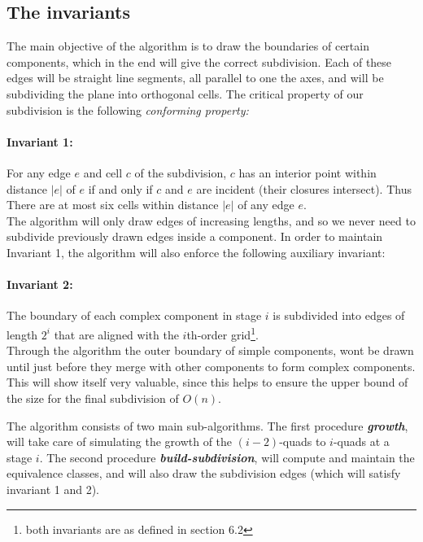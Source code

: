 \subsection{The invariants}

The main objective of the algorithm is to draw the boundaries of certain components, which in 
the end will give the correct subdivision. Each of these edges will be straight line segments,
all parallel to one the axes, and will be subdividing the plane into orthogonal cells. The 
critical property of our subdivision is the following \textit{conforming property:}

\paragraph{Invariant 1:} For any edge $e$ and cell $c$ of the subdivision, $c$ has an interior 
point within distance $|e|$ of $e$ if and only if $c$ and $e$ are incident (their closures 
intersect). Thus There are at most six cells within distance $|e|$ of any edge $e$. \\

The algorithm will only draw edges of increasing lengths, and so we never need to subdivide 
previously drawn edges inside a component. In order to maintain Invariant 1, the algorithm 
will also enforce the following auxiliary invariant:

\paragraph{Invariant 2:} The boundary of each complex component in stage $i$ is subdivided 
into edges of length $2^i$ that are aligned with the $i$th-order grid\footnote{both invariants 
are as defined in \cite{HershbergerS99} section 6.2}. \\

Through the algorithm the outer boundary of simple components, wont be drawn until just before 
they merge with other components to form complex components. This will show itself very valuable,
since this helps to ensure the upper bound of the size for the final subdivision of $O(n)$.

The algorithm consists of two main sub-algorithms. The first procedure \textit{\textbf{growth}}, 
will take care of simulating the growth of the $(i-2)$-quads to $i$-quads at a stage $i$. The 
second procedure \textit{\textbf{build-subdivision}}, will compute and maintain the equivalence 
classes, and will also draw the subdivision edges (which will satisfy invariant 1 and 2). 

